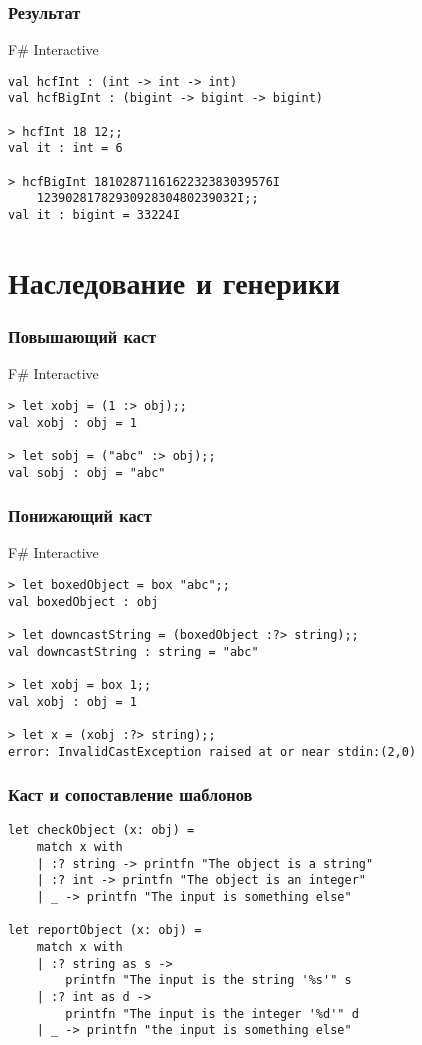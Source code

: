 \documentclass[xetex,mathserif,serif]{beamer}
\begin{document}
    \begin{frame}[fragile]
        \frametitle{Результат}
        \begin{alertblock}{F\# Interactive}
            \begin{verbatim}
val hcfInt : (int -> int -> int)
val hcfBigInt : (bigint -> bigint -> bigint)

> hcfInt 18 12;;
val it : int = 6

> hcfBigInt 1810287116162232383039576I 
    1239028178293092830480239032I;;
val it : bigint = 33224I
            \end{verbatim}
        \end{alertblock}
    \end{frame}

    \section{Наследование и генерики}
    
    \begin{frame}[fragile]
        \frametitle{Повышающий каст}
        \begin{alertblock}{F\# Interactive}
            \begin{verbatim}
> let xobj = (1 :> obj);;
val xobj : obj = 1

> let sobj = ("abc" :> obj);;
val sobj : obj = "abc"
            \end{verbatim}
        \end{alertblock}
    \end{frame}

    \begin{frame}[fragile]
        \frametitle{Понижающий каст}
        \begin{alertblock}{F\# Interactive}
            \begin{verbatim}
> let boxedObject = box "abc";;
val boxedObject : obj

> let downcastString = (boxedObject :?> string);;
val downcastString : string = "abc"

> let xobj = box 1;;
val xobj : obj = 1

> let x = (xobj :?> string);;
error: InvalidCastException raised at or near stdin:(2,0)
            \end{verbatim}
        \end{alertblock}
    \end{frame}

    \begin{frame}[fragile]
        \frametitle{Каст и сопоставление шаблонов}
        \begin{verbatim}
let checkObject (x: obj) =
    match x with
    | :? string -> printfn "The object is a string"
    | :? int -> printfn "The object is an integer"
    | _ -> printfn "The input is something else"

let reportObject (x: obj) =
    match x with
    | :? string as s -> 
        printfn "The input is the string '%s'" s
    | :? int as d -> 
        printfn "The input is the integer '%d'" d
    | _ -> printfn "the input is something else"
        \end{verbatim}
    \end{frame}
\end{document}
